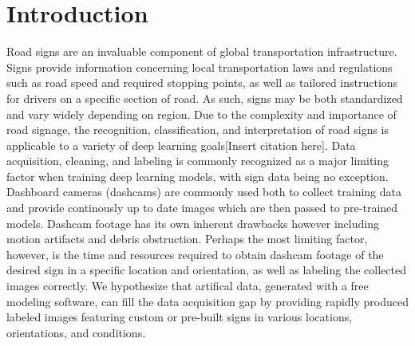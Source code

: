\documentclass[journal]{IEEEtran}
\begin{document}
\section{Introduction}
% 
% 
% 
% 

 
Road signs are an invaluable component of global transportation infrastructure. Signs provide information concerning local transportation laws and regulations such as road speed and required stopping points, as well as tailored instructions for drivers on a specific section of road. As such, signs may be both standardized and vary widely depending on region. Due to the complexity and importance of road signage, the recognition, classification, and interpretation of road signs is applicable to a variety of deep learning goals[Insert citation here]. Data acquisition, cleaning, and labeling is commonly recognized as a major limiting factor when training deep learning models\cite{Whang_datacollection}, with sign data being no exception. Dashboard cameras (dashcams) are commonly used both to collect training data and provide continously up to date images which are then passed to pre-trained models. Dashcam footage has its own inherent drawbacks however including motion artifacts and debris obstruction. Perhaps the most limiting factor, however, is the time and resources required to obtain dashcam footage of the desired sign in a specific location and orientation, as well as labeling the collected images correctly. We hypothesize that artifical data, generated with a free modeling software, can fill the data acquisition gap by providing rapidly produced labeled images featuring custom or pre-built signs in various locations, orientations, and conditions. 
\end{document}
